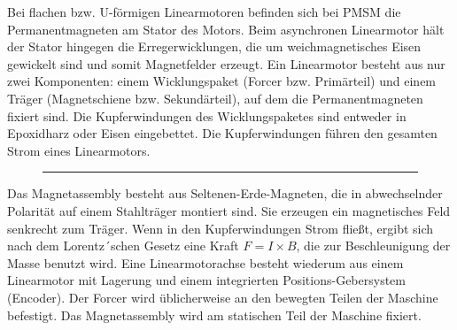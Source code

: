 \begin{description}[leftmargin=2.5cm]
					\item[Flache, U-förmige Linearmotoren] 
					Bei flachen bzw. U-förmigen Linearmotoren befinden sich bei PMSM die Permanentmagneten am Stator des Motors. Beim asynchronen Linearmotor hält der Stator hingegen die Erregerwicklungen, die um weichmagnetisches Eisen gewickelt sind und somit Magnetfelder erzeugt.	Ein Linearmotor besteht aus nur zwei Komponenten: einem Wicklungspaket (Forcer bzw. Primärteil) und einem Träger (Magnetschiene bzw. Sekundärteil), auf dem die Permanentmagneten fixiert sind. Die Kupferwindungen des Wicklungspaketes sind entweder in Epoxidharz oder Eisen eingebettet. Die Kupferwindungen führen den gesamten Strom eines Linearmotors. 	
					\begin{figure}[h]
						\centering \rule{2.5cm}{0cm}
						 \hspace{0.4cm}
					\end{figure}					
					Das Magnetassembly besteht aus Seltenen-Erde-Magneten, die in abwechselnder Polarität auf einem Stahlträger montiert sind. Sie erzeugen ein magnetisches Feld senkrecht zum Träger. Wenn in den Kupferwindungen Strom fließt, ergibt sich nach dem Lorentz´schen Gesetz eine Kraft $ F = I \times B $, die zur Beschleunigung der Masse benutzt wird. Eine Linearmotorachse besteht wiederum aus einem Linearmotor mit Lagerung und einem integrierten Positions-Gebersystem (Encoder). Der Forcer wird üblicherweise an den bewegten Teilen der Maschine befestigt. Das Magnetassembly wird am statischen Teil der Maschine fixiert. 
					\begin{figure}[h]

\end{figure}
\end{description}
